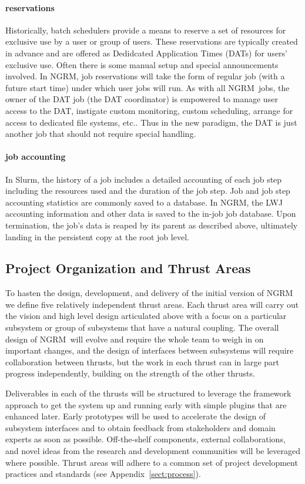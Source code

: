\documentclass[10pt]{article}
\newcommand{\ngrm}{NGRM}
\newcommand{\slurm}{Slurm}
\begin{document}
\paragraph{reservations}
Historically, batch schedulers provide a means to reserve a set of
resources for exclusive use by a user or group of users.  These
reservations are typically created in advance and are offered as
Dedidcated Application Times (DATs) for users' exclusive use.
Often there is some manual setup and special announcements involved.
In \ngrm, job reservations will take the form of regular job (with a
future start time) under which user jobs will run.  As with all \ngrm\ jobs,
the owner of the DAT job (the DAT coordinator) is empowered to manage
user access to the DAT, instigate custom monitoring, custom scheduling, 
arrange for access to dedicated file systems, etc..
Thus in the new paradigm, the DAT is just another job that should not require
special handling.

\paragraph{job accounting}
In \slurm, the history of a job includes a detailed accounting of each job step
including the resources used and the duration of the job step.
Job and job step accounting statistics are commonly saved to a database.
In \ngrm, the LWJ accounting information and other data is saved to the
in-job job database.  Upon termination, the job's data is reaped by its
parent as described above, ultimately landing in the persistent copy
at the root job level.

\subsection{Project Organization and Thrust Areas}
\label{sect:projorg}
To hasten the design, development, and delivery of the initial version
of \ngrm\, we define five relatively independent thrust areas.
Each thrust area will carry out the vision and high level design articulated
above with a focus on a particular subsystem or group of subsystems that
have a natural coupling.  The overall design of \ngrm\ will evolve and
require the whole team to weigh in on important changes, and the design
of interfaces between subsystems will require collaboration between
thrusts, but the work in each thrust can in large part progress
independently, building on the strength of the other thrusts.

Deliverables in each of the thrusts will be structured 
to leverage the framework approach to get the system up and running
early with simple plugins that are enhanced later.
Early prototypes will be used to accelerate the design of subsystem
interfaces and to obtain feedback from stakeholders and domain experts
as soon as possible.
Off-the-shelf components, external collaborations, and novel ideas from
the research and development communities will be leveraged where possible.
Thrust areas will adhere to a common set of project development practices
and standards (see Appendix~\ref{sect:process}).
\end{document}
